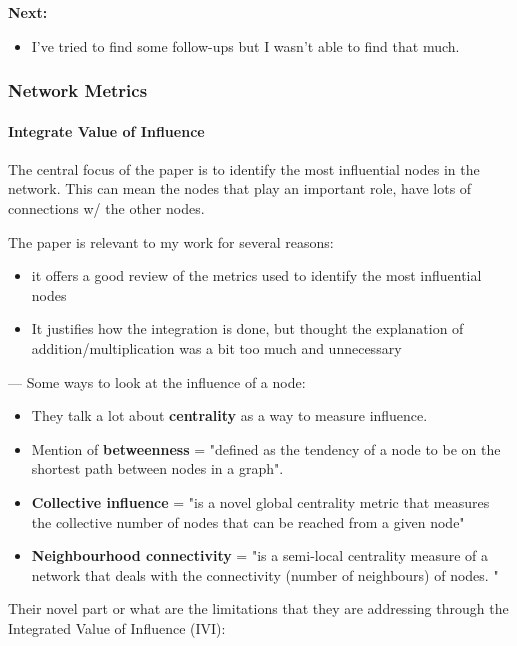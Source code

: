 \textbf{Next:}
\begin{itemize}
    \item I've tried to find some follow-ups but I wasn't able to find that much.
\end{itemize}



\subsubsection{Network Metrics}

\paragraph{Integrate Value of Influence}

The central focus of the paper is to identify the most influential nodes in the network. This can mean the nodes that play an important role, have lots of connections w/ the other nodes. 

The paper is relevant to my work for several reasons:
\begin{itemize}
    \item it offers a good review of the metrics used to identify the most influential nodes
    \item  It justifies how the integration is done, but thought the explanation of addition/multiplication was a bit too much and unnecessary
\end{itemize}

--- 
Some ways to look at the influence of a node: 

\begin{itemize}
    \item They talk a lot about \textbf{centrality} as a way to measure influence.
    \item Mention of \textbf{betweenness} = "defined as the tendency of a node to be on the shortest path between nodes in a graph".
    \item \textbf{Collective influence} =  "is a novel global centrality metric that measures the collective number of nodes that can be reached from a given node" 
    \item\textbf{ Neighbourhood connectivity} = "is a semi-local centrality measure of a network that deals with the connectivity (number of neighbours) of nodes. "

\end{itemize}

Their novel part or what are the limitations that they are addressing through the Integrated Value of Influence (IVI):

